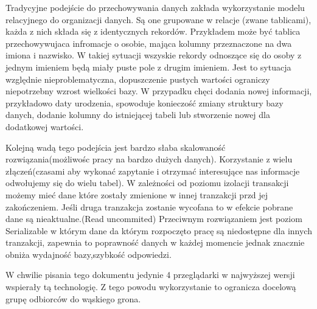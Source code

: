 Tradycyjne podejście do przechowywania danych zakłada wykorzystanie modelu relacyjnego do organizacji danych. Są one grupowane w relacje (zwane tablicami), każda z nich składa się z identycznych rekordów. Przykładem może być tablica przechowywujaca infromacje o osobie, mająca kolumny przeznaczone na dwa imiona i nazwisko. W takiej sytuacji wszyskie rekordy odnoszące się do osoby z jednym imieniem będą miały puste pole z drugim imieniem. Jest to sytuacja względnie nieproblematyczna, dopuszczenie pustych wartości ograniczy niepotrzebny wzrost wielkości bazy.
W przypadku chęci dodania nowej informacji, przykładowo daty urodzenia, spowoduje konieczość zmiany struktury bazy danych, dodanie kolumny do istniejącej tabeli lub stworzenie nowej dla dodatkowej wartości.

Kolejną wadą tego podejścia jest bardzo słaba skalowaność rozwiązania(możliwośc pracy na bardzo dużych danych). Korzystanie z wielu złączeń(czasami aby wykonać zapytanie i otrzymać interesujące nas informacje odwołujemy się do wielu tabel).
W zależności od poziomu izolacji transakcji możemy mieć dane które zostały zmienione w innej tranzakcji przd jej zakończeniem. Jeśli druga tranzakcja zostanie wycofana to w efekcie pobrane dane są nieaktualne.(Read uncommited)
Przeciwnym rozwiązaniem jest poziom Serializable w którym dane da którym rozpoczęto pracę są niedostępne dla innych tranzakcji, zapewnia to poprawność danych w każdej momencie jednak znacznie obniża wydajność bazy,szybkość odpowiedzi.

W chwilie pisania tego dokumentu jedynie 4 przeglądarki w najwyższej wersji wspierały tą technologię. Z tego powodu wykorzystanie to ogranicza docelową grupę odbiorców do wąskiego grona. 